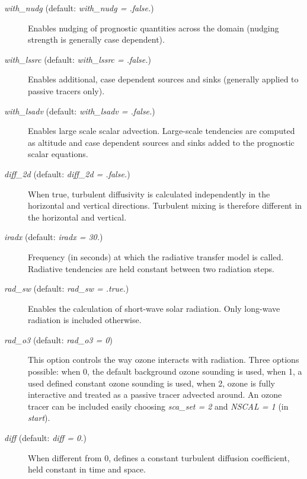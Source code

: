 \documentclass[12pt,A4,french]{article}
\begin{document}
\begin{description}
\item[{\it with\_nudg} (default: {\it with\_nudg = .false.})]

Enables nudging of prognostic quantities across the domain (nudging strength is generally case dependent). 

\item[{\it with\_lssrc} (default: {\it with\_lssrc = .false.})]

Enables additional, case dependent sources and sinks (generally applied to passive tracers only).

\item[{\it with\_lsadv} (default: {\it with\_lsadv = .false.})]

Enables large scale scalar advection. Large-scale tendencies are computed as altitude and case dependent sources and sinks added to the prognostic scalar equations.

\item[{\it diff\_2d} (default: {\it diff\_2d = .false.})]

When true, turbulent diffusivity is calculated independently in the horizontal and vertical directions. Turbulent mixing is therefore different in the horizontal and vertical.

\item[{\it iradx} (default: {\it iradx = 30.})]

Frequency (in seconds) at which the radiative transfer model is called. Radiative tendencies are held constant between two radiation steps.

\item[{\it rad\_sw} (default: {\it rad\_sw = .true.})]

Enables the calculation of short-wave solar radiation. Only long-wave radiation is included otherwise.

\item[{\it rad\_o3} (default: {\it rad\_o3 = 0})]

This option controls the way ozone interacts with radiation. Three options possible: when 0, the default background ozone sounding is used, when 1, a used defined constant ozone sounding is used, when 2, ozone is fully interactive and treated as a passive tracer advected around. An ozone tracer can be included easily choosing {\it sca\_set = 2} and {\it NSCAL = 1} (in {\it start}).

\item[{\it diff} (default: {\it diff = 0.})]

When different from 0, defines a constant turbulent diffusion coefficient, held constant in time and space.


\end{description}
\end{document}
